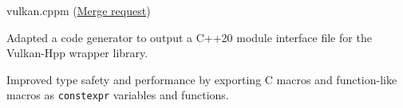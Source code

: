 
\begin{cventries}
	{vulkan.cppm \footnotesize{(\href{https://github.com/KhronosGroup/Vulkan-Hpp/pull/1582}{Merge request})}} %
	{} %
	{} %
	{
		\begin{cvitems} %
			\item Adapted a code generator to output a C++20 module interface file for the Vulkan-Hpp wrapper library.
			\item Improved type safety and performance by exporting C macros and function-like macros as \texttt{constexpr} variables and functions.
		\end{cvitems}
	}


\end{cventries}

